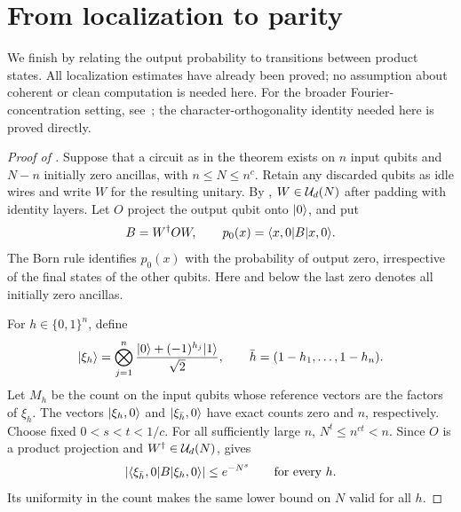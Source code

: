 \section{From localization to parity}
\label{sec:parity}

We finish by relating the output probability to transitions between
product states. All localization estimates have already been proved;
no assumption about coherent or clean computation is needed here.
For the broader Fourier-concentration setting, see~\cite{GGJ2026};
the character-orthogonality identity needed here is proved directly.

\begin{proof}[Proof of ]
Suppose that a circuit as in the theorem exists on \(n\) input qubits
and \(N-n\) initially zero ancillas, with \(n\le N\le n^c\).
Retain any discarded qubits as idle wires and write \(W\) for the
resulting unitary. By , \(W\in\mathcal U_d(N)\)
after padding with identity layers.
Let \(O\) project the output qubit onto \(\lvert 0\rangle\), and put
\[
 B=W^\dagger OW,\qquad
 p_0(x)=\langle x,0\rvert B\lvert x,0\rangle.
\]
The Born rule identifies \(p_0(x)\) with the probability of output
zero, irrespective of the final states of the other qubits.
Here and below the last zero denotes all initially zero ancillas.

For \(h\in\{0,1\}^n\), define
\[
 \lvert \xi_h\rangle
 =\bigotimes_{j=1}^n
   \frac{\lvert 0\rangle+(-1)^{h_j}\lvert 1\rangle}{\sqrt2},
 \qquad
 \bar h=(1-h_1,\ldots,1-h_n).
\]
Let \(M_h\) be the count on the input qubits whose reference vectors
are the factors of \(\xi_h\). The vectors
\(\lvert \xi_h,0\rangle\) and \(\lvert \xi_{\bar h},0\rangle\) have exact counts
zero and \(n\), respectively.
Choose fixed \(0<s<t<1/c\). For all sufficiently large \(n\),
\(N^t\le n^{ct}<n\). Since \(O\) is a product projection and
\(W^\dagger\in\mathcal U_d(N)\),  gives
\begin{equation}
\label{eq:complementary-entry}
 \left|\langle \xi_{\bar h},0\rvert B\lvert \xi_h,0\rangle\right|
 \le e^{-N^s}
 \qquad\text{for every }h.
\end{equation}
Its uniformity in the count makes the same lower bound on \(N\)
valid for all \(h\).


\end{proof}
